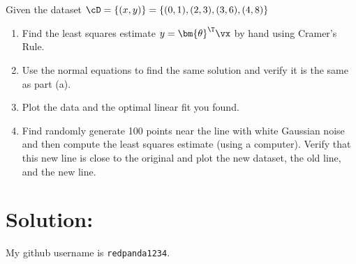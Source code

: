 \documentclass[189]{pset}
\begin{document}

  \section{}
    Given the dataset $\cD = \{(x,y)\} = \{(0,1), (2,3), (3,6), (4,8)\}$
    \begin{enumerate}
      \item Find the least squares estimate $y = {\bm{\theta}}^\T\vx$ by
        hand using Cramer's Rule.
      \item Use the normal equations to find the same solution and
        verify it is the same as part (a).
      \item Plot the data and the optimal linear fit you found.
      \item Find randomly generate 100 points near the line with white
        Gaussian noise and then compute the least squares estimate
        (using a computer). Verify that this new line is close to the
        original and plot the new dataset, the old line, and the new
        line.
    \end{enumerate}

  \hrulefill

  \section*{Solution:}
  My github username is \texttt{redpanda1234}.
\end{document}
